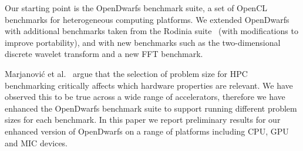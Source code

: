 \documentclass[../document.tex]{subfiles}
\begin{document}
Our starting point is the OpenDwarfs benchmark suite, a set of OpenCL benchmarks for heterogeneous computing platforms.\cite{krommydas2016opendwarfs}
We extended OpenDwarfs with additional benchmarks taken from the Rodinia suite~\cite{che2009rodinia} (with modifications to improve portability), and with new benchmarks such as the two-dimensional discrete wavelet transform and a new FFT benchmark.

Marjanovi\'{c} et al.~\cite{marjanovic2016hpc} argue that the selection of problem size for HPC benchmarking critically affects which hardware properties are relevant.
We have observed this to be true across a wide range of accelerators, therefore we have enhanced the OpenDwarfs benchmark suite to support running different problem sizes for each benchmark.
In this paper we report preliminary results for our enhanced version of OpenDwarfs on a range of platforms including CPU, GPU and MIC devices.

\end{document}
